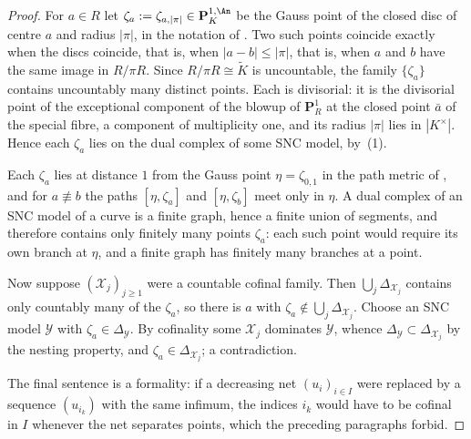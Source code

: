 \begin{proof}
For \(a\in R\) let \(\zeta_a:=\zeta_{a,|\pi|}\in\mathbf P^{1,\An}_K\) be the
Gauss point of the closed disc of centre \(a\) and radius \(|\pi|\), in the
notation of .  Two such points coincide exactly when
the discs coincide, that is, when \(|a-b|\leq|\pi|\), that is, when \(a\) and
\(b\) have the same image in \(R/\pi R\).  Since
\(R/\pi R\cong\widetilde K\) is uncountable, the family
\(\{\zeta_a\}\) contains uncountably many distinct points.  Each is
divisorial: it is the divisorial point of the exceptional component of the
blowup of \(\mathbf P^1_R\) at the closed point \(\bar a\) of the special
fibre, a component of multiplicity one, and its radius \(|\pi|\) lies in
\(|K^\times|\).  Hence each \(\zeta_a\) lies on the dual complex of some SNC
model, by \,(1).

Each \(\zeta_a\) lies at distance \(1\) from the Gauss point
\(\eta=\zeta_{0,1}\) in the path metric of
, and for \(a\not\equiv b\) the paths
\([\eta,\zeta_a]\) and \([\eta,\zeta_b]\) meet only in \(\eta\).  A dual
complex of an SNC model of a curve is a finite graph, hence a finite union
of segments, and therefore contains only finitely many points \(\zeta_a\):
each such point would require its own branch at \(\eta\), and a finite graph
has finitely many branches at a point.

Now suppose \((\mathcal X_j)_{j\geq1}\) were a countable cofinal family.
Then \(\bigcup_j\Delta_{\mathcal X_j}\) contains only countably many of the
\(\zeta_a\), so there is \(a\) with
\(\zeta_a\notin\bigcup_j\Delta_{\mathcal X_j}\).  Choose an SNC model
\(\mathcal Y\) with \(\zeta_a\in\Delta_{\mathcal Y}\).  By cofinality some
\(\mathcal X_j\) dominates \(\mathcal Y\), whence
\(\Delta_{\mathcal Y}\subset\Delta_{\mathcal X_j}\) by the nesting property,
and \(\zeta_a\in\Delta_{\mathcal X_j}\); a contradiction.

The final sentence is a formality: if a decreasing net
\((u_i)_{i\in I}\) were replaced by a sequence \((u_{i_k})\) with the same
infimum, the indices \(i_k\) would have to be cofinal in \(I\) whenever the
net separates points, which the preceding paragraphs forbid.
\end{proof}

